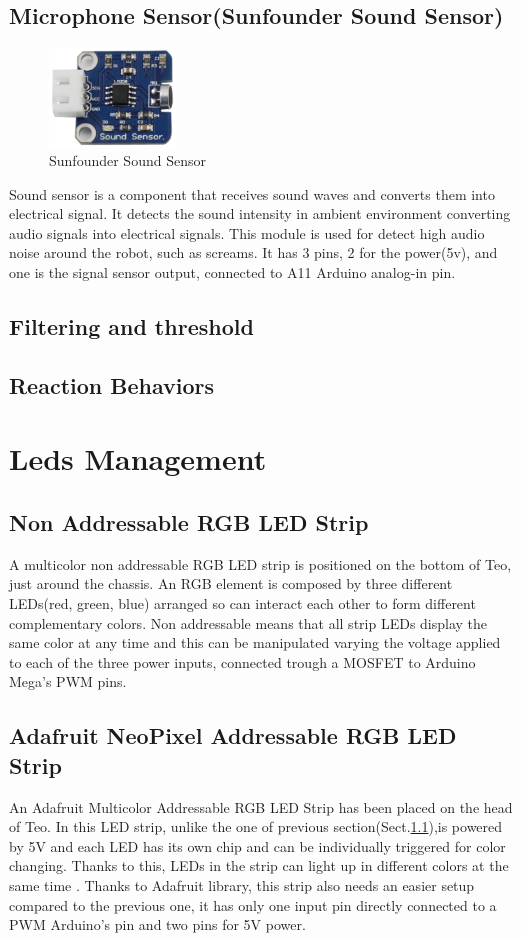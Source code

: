 \subsection{Microphone Sensor(Sunfounder Sound Sensor)}
\begin{figure}[h]
	\centering
	\includegraphics[width=0.3\textwidth]{soundSensor}
	\caption{Sunfounder Sound Sensor}
\end{figure}
Sound sensor is a component that receives sound waves and converts them into electrical signal. It detects the sound intensity in ambient environment converting audio signals into electrical signals. This module is used for detect high audio noise around the robot, such as screams. It has 3 pins, 2 for the power(5v), and one is the signal sensor output, connected to A11 Arduino analog-in pin. 
\subsection{Filtering and threshold}
\subsection{Reaction Behaviors}

\section{Leds Management}
\subsection{Non Addressable RGB LED Strip}
\label{LEDSTRIP}
A multicolor non addressable RGB LED strip is positioned on the bottom of Teo, just around the chassis. An RGB element is composed by three different LEDs(red, green, blue) arranged so can interact each other to form different complementary colors. Non addressable means that all strip LEDs display the same color at any time and this can be manipulated varying the voltage applied to each of the three power inputs, connected trough a MOSFET to Arduino Mega's PWM pins.


\subsection{Adafruit NeoPixel Addressable RGB LED Strip}
An Adafruit Multicolor Addressable RGB LED Strip has been placed on the head of Teo. In this LED strip, unlike the one of previous section(Sect.\ref{LEDSTRIP}),is powered by 5V and each LED has its own chip and can be individually triggered for color changing. Thanks to this, LEDs in the strip can light up in different colors at the same time \cite{schiller2010automated}.
Thanks to Adafruit library, this strip also needs an easier setup compared to the previous one, it has only one input pin directly connected to a PWM Arduino's pin and two pins for 5V power.
